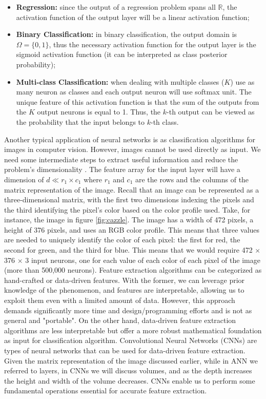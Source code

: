 \begin{itemize}
    \item \textbf{Regression:} since the output of a regression problem spans all $\mathbb{R}$, the activation function of the output layer will be a linear activation function;
    \item \textbf{Binary Classification:} in binary classification, the output domain is $\Omega=\{0, 1\}$, thus the necessary activation function for the output layer is the sigmoid activation function (it can be interpreted as class posterior probability);
    \item \textbf{Multi-class Classification:} when dealing with multiple classes ($K$) use as many neuron as classes and each output neuron will use softmax unit. The unique feature of this activation function is that the sum of the outputs from the $K$ output neurons is equal to 1. Thus, the $k$-th output can be viewed as the probability that the input belongs to $k$-th class.
\end{itemize}
Another typical application of neural networks is as classification algorithms for images in computer vision. However, images cannot be used directly as input. We need some intermediate steps to extract useful information and reduce the problem's dimensionality \cite{giacomo_boracchi_convolutional_2021}. The feature array for the input layer will have a dimension of $d\ll r_1 \times c_1$ where $r_1$ and $c_1$ are the rows and the columns of the matrix representation of the image. Recall that an image can be represented as a three-dimensional matrix, with the first two dimensions indexing the pixels and the third identifying the pixel's color based on the color profile used. Take, for instance, the image in figure \ref{fig:cazzle}. The image has a width of 472 pixels, a height of 376 pixels, and uses an RGB color profile. This means that three values are needed to uniquely identify the color of each pixel: the first for red, the second for green, and the third for blue. This means that we would require 472 $\times$ 376 $\times$ 3 input neurons, one for each value of each color of each pixel of the image (more than 500,000 neurons). Feature extraction algorithms can be categorized as hand-crafted or data-driven features. With the former, we can leverage prior knowledge of the phenomenon, and features are interpretable, allowing us to exploit them even with a limited amount of data. However, this approach demands significantly more time and design/programming efforts and is not as general and "portable". On the other hand, data-driven feature extraction algorithms are less interpretable but offer a more robust mathematical foundation as input for classification algorithm. Convolutional Neural Networks (CNNs) are types of neural networks that can be used for data-driven feature extraction. Given the matrix representation of the image discussed earlier, while in ANN we referred to layers, in CNNs we will discuss volumes, and as the depth increases the height and width of the volume decreases. CNNs enable us to perform some fundamental operations essential for accurate feature extraction.
